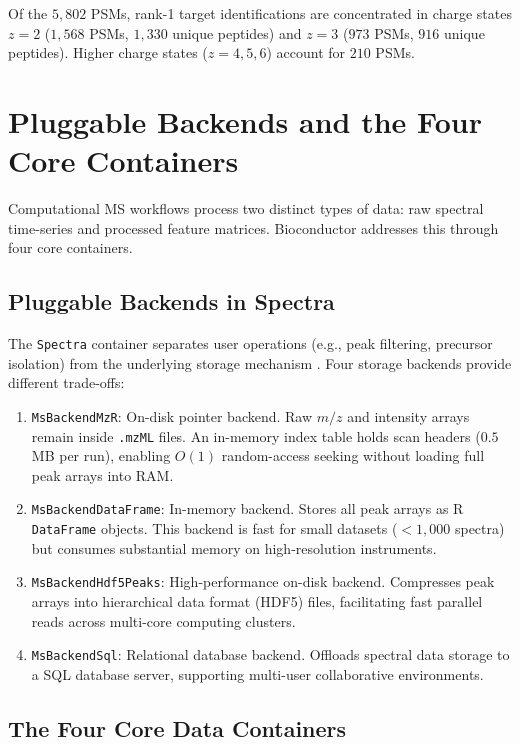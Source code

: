 \documentclass[11pt,twoside,openright]{book}
\begin{document}
Of the $5{,}802$ PSMs, rank-1 target identifications are concentrated in charge states $z = 2$ ($1{,}568$ PSMs, $1{,}330$ unique peptides) and $z = 3$ ($973$ PSMs, $916$ unique peptides). Higher charge states ($z = 4, 5, 6$) account for $210$ PSMs.

\FloatBarrier
\section{Pluggable Backends and the Four Core Containers}
\label{sec:backends_containers}

Computational MS workflows process two distinct types of data: raw spectral time-series and processed feature matrices. Bioconductor addresses this through four core containers.

\subsection{Pluggable Backends in Spectra}

The \texttt{Spectra} container separates user operations (e.g., peak filtering, precursor isolation) from the underlying storage mechanism \cite{rainer2022spectra, gatto2021msnbase}. Four storage backends provide different trade-offs:
\begin{enumerate}
\item \texttt{MsBackendMzR}: On-disk pointer backend. Raw $m/z$ and intensity arrays remain inside \texttt{.mzML} files. An in-memory index table holds scan headers ($0.5$ MB per run), enabling $O(1)$ random-access seeking without loading full peak arrays into RAM.
\item \texttt{MsBackendDataFrame}: In-memory backend. Stores all peak arrays as R \texttt{DataFrame} objects. This backend is fast for small datasets ($< 1{,}000$ spectra) but consumes substantial memory on high-resolution instruments.
\item \texttt{MsBackendHdf5Peaks}: High-performance on-disk backend. Compresses peak arrays into hierarchical data format (HDF5) files, facilitating fast parallel reads across multi-core computing clusters.
\item \texttt{MsBackendSql}: Relational database backend. Offloads spectral data storage to a SQL database server, supporting multi-user collaborative environments.
\end{enumerate}

\subsection{The Four Core Data Containers}
\end{document}
